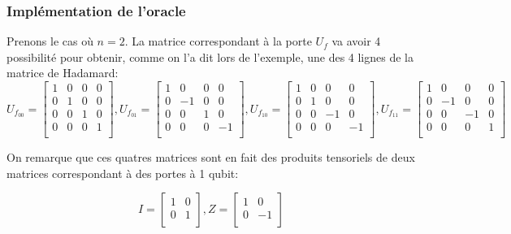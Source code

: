 \documentclass[12pt,a4paper]{article}
\begin{document}
\subsubsection*{Implémentation de l'oracle}

Prenons le cas où $n=2$. La matrice correspondant à la porte $U_f$ va avoir 4 possibilité pour obtenir, comme on l'a dit lors de l'exemple, une des 4 lignes de la matrice de Hadamard:
\[
U_{f_{00}} = 
\begin{bmatrix}
  1 & 0 & 0 & 0 \\
  0 & 1 & 0 & 0 \\
  0 & 0 & 1 & 0 \\
  0 & 0 & 0 & 1 \\
\end{bmatrix}
, U_{f_{01}} = 
\begin{bmatrix}
  1 & 0 & 0 & 0 \\
  0 & -1 & 0 & 0 \\
  0 & 0 & 1 & 0 \\
  0 & 0 & 0 & -1 \\
\end{bmatrix}
,U_{f_{10}} = 
\begin{bmatrix}
  1 & 0 & 0 & 0 \\
  0 & 1 & 0 & 0 \\
  0 & 0 & -1 & 0 \\
  0 & 0 & 0 & -1 \\
\end{bmatrix}
, U_{f_{11}} = 
\begin{bmatrix}
  1 & 0 & 0 & 0 \\
  0 & -1 & 0 & 0 \\
  0 & 0 & -1 & 0 \\
  0 & 0 & 0 & 1 \\
\end{bmatrix}
\]

On remarque que ces quatres matrices sont en fait des produits tensoriels de deux matrices correspondant à des portes à 1 qubit:

\[
  I = 
  \begin{bmatrix}
    1 & 0 \\
    0 & 1 \\
  \end{bmatrix}
  , Z = 
  \begin{bmatrix}
    1 & 0 \\
    0 & -1 \\
  \end{bmatrix}
\]
\end{document}
